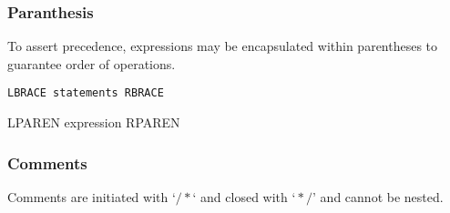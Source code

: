 \documentclass[./LRM_main.tex]{subfiles}
\begin{document}
\subsubsection{Paranthesis }
To assert precedence, expressions may be encapsulated within parentheses to guarantee order of operations.
\begin{lstlisting}
LBRACE statements RBRACE
\end{lstlisting}
LPAREN expression RPAREN
\subsubsection{Comments }
Comments are initiated with $‘/* ‘$ and closed with $‘*/’$ and cannot be nested.
\end{document}
